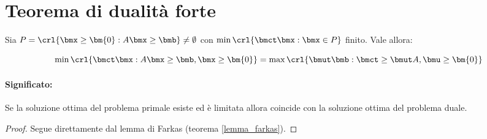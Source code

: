\documentclass[\main/main.tex]{subfiles}
\begin{document}
\section{Teorema di dualità forte}

\begin{theorem}
  \label{dualita_forte}
  Sia $P=\crl{\bmx\geq\bm{0}: A\bmx\geq\bmb} \neq \emptyset$ con $\min\crl{\bmct\bmx: \bmx \in P}$ finito. Vale allora:

  \[
    \min\crl{\bmct\bmx: A\bmx \geq \bmb, \bmx \geq \bm{0}} = \max\crl{\bmut\bmb: \bmct \geq \bmut A, \bmu \geq \bm{0}}
  \]
  \paragraph*{Significato:} Se la soluzione ottima del problema primale esiste ed è limitata allora coincide con la soluzione ottima del problema duale.
\end{theorem}

\begin{proof}
  Segue direttamente dal lemma di Farkas (teorema \ref{lemma_farkas}).
\end{proof}
\end{document}

